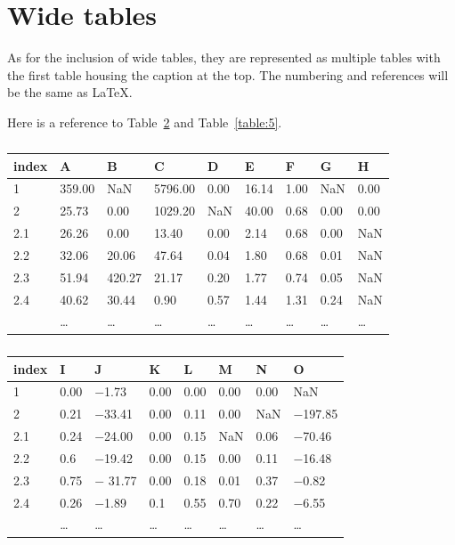 \section{Wide tables}
As for the inclusion of wide tables, they are represented as multiple tables with
the first table housing the caption at the top. The numbering and references will be
the same as LaTeX.

Here is a reference to Table~\ref{table:4} and Table~\ref{table:5}.
\begin{table}
\centering
\begin{tabular}{lllllllll}
\toprule
index  &  A  &  B     & C   &  D  &  E  &  F  &  G  & H  \\
\midrule
1 & 359.00 & NaN & 5796.00 & 0.00 & 16.14 & 1.00 & NaN & 0.00\\
2 & 25.73 & 0.00 & 1029.20 & NaN & 40.00 & 0.68 & 0.00 & 0.00\\
2.1 & 26.26 & 0.00 & 13.40 & 0.00 & 2.14 & 0.68 & 0.00 & NaN\\
2.2 & 32.06 & 20.06 & 47.64 & 0.04 & 1.80 & 0.68 & 0.01 & NaN\\
2.3 & 51.94 & 420.27 & 21.17 & 0.20 & 1.77 & 0.74 & 0.05 & NaN\\
2.4 & 40.62 & 30.44 & \phantom{000}0.90 & 0.57 & 1.44 & 1.31 & 0.24 & NaN\\
 & \ldots & \ldots&  \ldots& \ldots &  \ldots& \ldots& \ldots & \ldots \\
\bottomrule
\end{tabular}
\begin{tabular}{llllllll}
\toprule
index &    I  &  J  &  K  &  L  &  M  &  N & O \\
\midrule
1 & 0.00 & $-$1.73 & 0.00 & 0.00 & 0.00 & 0.00 & NaN\\
2 & 0.21 & $-$33.41 & 0.00 & 0.11 & 0.00 & NaN & $-$197.85\\
2.1 & 0.24 & $-$24.00 & 0.00 & 0.15 & NaN & 0.06 & $-$70.46\\
2.2 & 0.6 & $-$19.42 & 0.00 & 0.15 & 0.00 & 0.11 & $-$16.48\\
2.3 & 0.75 & $-$ 31.77 & 0.00 & 0.18 & 0.01 & 0.37 & $-$0.82\\
2.4 & 0.26 & $-$1.89 & 0.1 & 0.55 & 0.70 & 0.22 & $-$6.55 \\
  &\ldots &  \ldots&  \ldots& \ldots & \ldots & \ldots & \ldots \\
\bottomrule
\end{tabular}
\caption{}
\label{table:4}

\end{table}


